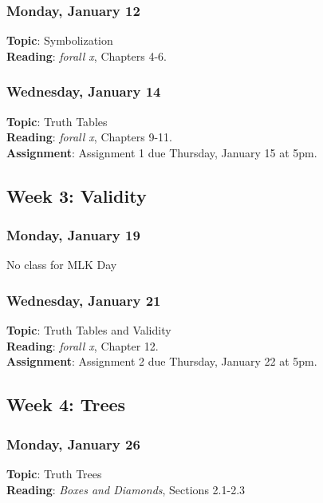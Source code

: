\documentclass[
  letterpaper,
  DIV=11,
  numbers=noendperiod]{scrartcl}
\begin{document}
\subsubsection{Monday, January 12}\label{monday-january-12}

\textbf{Topic}: Symbolization\\
\textbf{Reading}: \emph{forall x}, Chapters 4-6.

\subsubsection{Wednesday, January 14}\label{wednesday-january-14}

\textbf{Topic}: Truth Tables\\
\textbf{Reading}: \emph{forall x}, Chapters 9-11.\\
\textbf{Assignment}: Assignment 1 due Thursday, January 15 at 5pm.

\subsection{Week 3: Validity}\label{week-3-validity}

\subsubsection{Monday, January 19}\label{monday-january-19}

No class for MLK Day

\subsubsection{Wednesday, January 21}\label{wednesday-january-21}

\textbf{Topic}: Truth Tables and Validity\\
\textbf{Reading}: \emph{forall x}, Chapter 12.\\
\textbf{Assignment}: Assignment 2 due Thursday, January 22 at 5pm.

\subsection{Week 4: Trees}\label{week-4-trees}

\subsubsection{Monday, January 26}\label{monday-january-26}

\textbf{Topic}: Truth Trees\\
\textbf{Reading}: \emph{Boxes and Diamonds}, Sections 2.1-2.3
\end{document}
